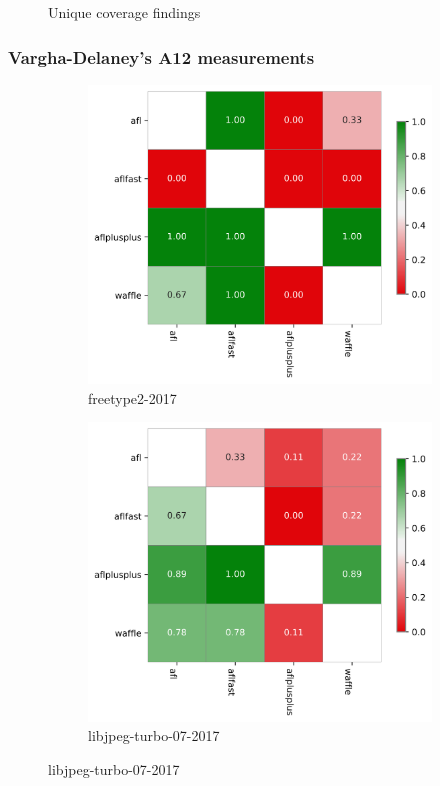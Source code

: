 \begin{figure}
    \caption{Unique coverage findings}
    \label{fig:cov-growth-uniq}
\end{figure}

\subsubsection{Vargha-Delaney's A12 measurements}

\begin{figure}
    \centering
    \begin{subfigure}[b]{0.475\linewidth}
        \centering
        \includegraphics[width=0.95\linewidth]{Experiments/freetype2-2017_varga_delaney_a12_plot.png}
        \caption{freetype2-2017}
        \label{fig:sub:freetype-vda12}
    \end{subfigure}
    \begin{subfigure}[b]{0.475\linewidth}
        \centering
        \includegraphics[width=0.95\linewidth]{Experiments/libjpeg-turbo-07-2017_varga_delaney_a12_plot.png}
        \caption{libjpeg-turbo-07-2017}
        \label{fig:sub:libjpeg-vda12}
    \end{subfigure}


\end{figure}
